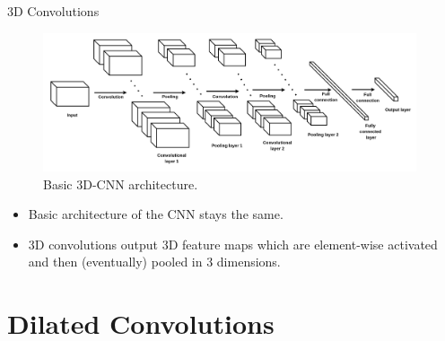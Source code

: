 \begin{vbframe}{3D Convolutions}
    \begin{figure}
        \centering
        \includegraphics[width=11cm]{plots/05_conv_variations/3d/3dconv_arch.png}
        \caption{Basic 3D-CNN architecture.}
    \end{figure}
    \begin{itemize}
        \item Basic architecture of the CNN stays the same.
        \item 3D convolutions output 3D feature maps which are element-wise activated and then (eventually) pooled in 3 dimensions.
    \end{itemize}
\end{vbframe}

\section{Dilated Convolutions}

